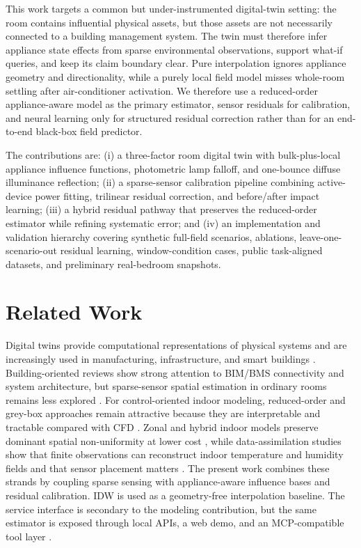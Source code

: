 \documentclass[conference]{IEEEtran}
\begin{document}
This work targets a common but under-instrumented digital-twin setting: the room contains influential physical assets, but those assets are not necessarily connected to a building management system. The twin must therefore infer appliance state effects from sparse environmental observations, support what-if queries, and keep its claim boundary clear. Pure interpolation ignores appliance geometry and directionality, while a purely local field model misses whole-room settling after air-conditioner activation. We therefore use a reduced-order appliance-aware model as the primary estimator, sensor residuals for calibration, and neural learning only for structured residual correction rather than for an end-to-end black-box field predictor.

The contributions are: (i) a three-factor room digital twin with bulk-plus-local appliance influence functions, photometric lamp falloff, and one-bounce diffuse illuminance reflection; (ii) a sparse-sensor calibration pipeline combining active-device power fitting, trilinear residual correction, and before/after impact learning; (iii) a hybrid residual pathway that preserves the reduced-order estimator while refining systematic error; and (iv) an implementation and validation hierarchy covering synthetic full-field scenarios, ablations, leave-one-scenario-out residual learning, window-condition cases, public task-aligned datasets, and preliminary real-bedroom snapshots.

\section{Related Work}
Digital twins provide computational representations of physical systems and are increasingly used in manufacturing, infrastructure, and smart buildings \cite{tao2019digitaltwin,fuller2020digitaltwin}. Building-oriented reviews show strong attention to BIM/BMS connectivity and system architecture, but sparse-sensor spatial estimation in ordinary rooms remains less explored \cite{cespedes2024bdtreview}. For control-oriented indoor modeling, reduced-order and grey-box approaches remain attractive because they are interpretable and tractable compared with CFD \cite{bacher2011heatdynamics,hietaharju2018dynamicmodel,gokhale2022pinnthermal}. Zonal and hybrid indoor models preserve dominant spatial non-uniformity at lower cost \cite{teshome2004zonalreview,megri2022doma,huljak2025hybrid}, while data-assimilation studies show that finite observations can reconstruct indoor temperature and humidity fields and that sensor placement matters \cite{qian2025dafield,chen2007zonalnetwork}. The present work combines these strands by coupling sparse sensing with appliance-aware influence bases and residual calibration. IDW \cite{shepard1968two} is used as a geometry-free interpolation baseline. The service interface is secondary to the modeling contribution, but the same estimator is exposed through local APIs, a web demo, and an MCP-compatible tool layer \cite{mcp2025}.
\end{document}
